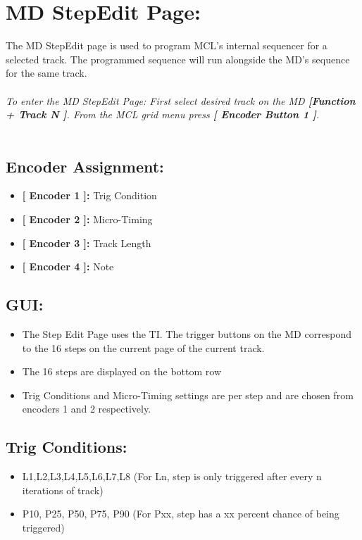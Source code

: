 \chapter{MD StepEdit Page:}

The MD StepEdit page is used to program MCL's  internal sequencer for a selected track. The programmed sequence will run alongside the MD's sequence for the same track.\\
\\\textit{To enter the MD StepEdit Page: First select desired track on the MD \textbf{[Function + Track N ]}. From the MCL grid menu press \textbf{[ Encoder Button 1 ]}.}\\
\\
\section{Encoder Assignment:}
\begin{itemize}
	\item \textbf{[ Encoder 1 ]: } Trig Condition
	\item \textbf{[ Encoder 2 ]: } Micro-Timing
	\item \textbf{[ Encoder 3 ]: } Track Length
	\item \textbf{[ Encoder 4 ]: } Note
\end{itemize}
\section{GUI:}
\begin{itemize}
\item The Step Edit Page uses the TI. The trigger buttons on the MD correspond to the 16 steps on the current page of the current track.
\item The 16 steps are displayed on the bottom row
\item Trig Conditions and Micro-Timing settings are per step and are chosen from encoders 1 and 2 respectively.
\end{itemize}
\section{Trig Conditions:}
\begin{itemize}
\item L1,L2,L3,L4,L5,L6,L7,L8 (For Ln, step is only triggered after every n iterations of track)
\item P10, P25, P50, P75, P90 (For Pxx, step has a xx percent chance of being triggered)
\end{itemize}

